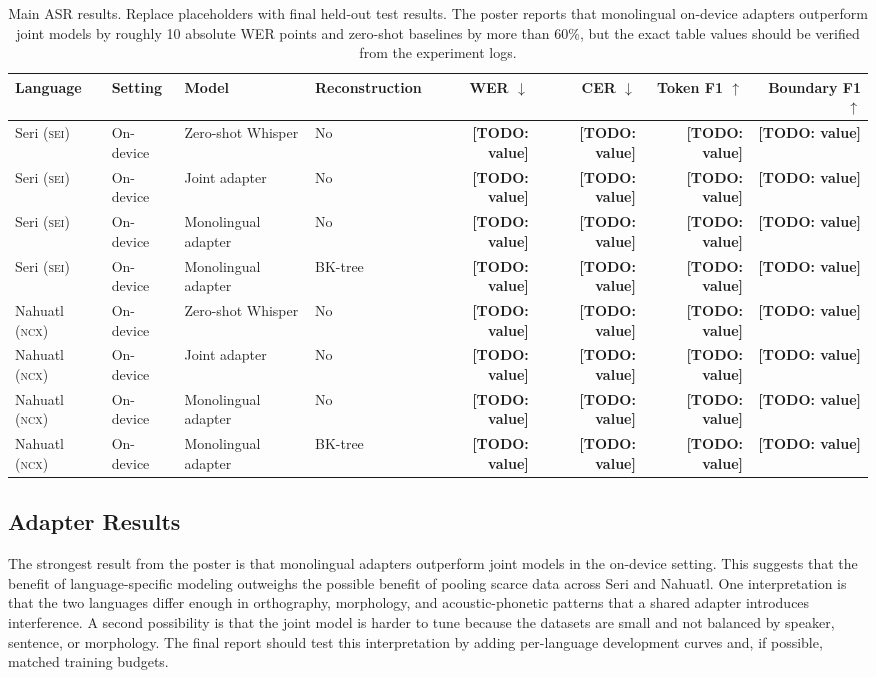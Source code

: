 \documentclass[11pt]{article}
\newcommand{\sei}{\textsc{sei}}
\newcommand{\ncx}{\textsc{ncx}}
\newcommand{\todo}[1]{\textbf{[TODO: #1]}}
\begin{document}
\begin{table}[t]
\centering
\small
\begin{tabular}{@{}llllrrrr@{}}
\toprule
Language & Setting & Model & Reconstruction & WER $\downarrow$ & CER $\downarrow$ & Token F1 $\uparrow$ & Boundary F1 $\uparrow$ \\
\midrule
Seri (\sei) & On-device & Zero-shot Whisper & No & \todo{value} & \todo{value} & \todo{value} & \todo{value} \\
Seri (\sei) & On-device & Joint adapter & No & \todo{value} & \todo{value} & \todo{value} & \todo{value} \\
Seri (\sei) & On-device & Monolingual adapter & No & \todo{value} & \todo{value} & \todo{value} & \todo{value} \\
Seri (\sei) & On-device & Monolingual adapter & BK-tree & \todo{value} & \todo{value} & \todo{value} & \todo{value} \\
\midrule
Nahuatl (\ncx) & On-device & Zero-shot Whisper & No & \todo{value} & \todo{value} & \todo{value} & \todo{value} \\
Nahuatl (\ncx) & On-device & Joint adapter & No & \todo{value} & \todo{value} & \todo{value} & \todo{value} \\
Nahuatl (\ncx) & On-device & Monolingual adapter & No & \todo{value} & \todo{value} & \todo{value} & \todo{value} \\
Nahuatl (\ncx) & On-device & Monolingual adapter & BK-tree & \todo{value} & \todo{value} & \todo{value} & \todo{value} \\
\bottomrule
\end{tabular}
\caption{Main ASR results. Replace placeholders with final held-out test results. The poster reports that monolingual on-device adapters outperform joint models by roughly 10 absolute WER points and zero-shot baselines by more than 60\%, but the exact table values should be verified from the experiment logs.}
\label{tab:main-results}
\end{table}

\subsection{Adapter Results}

The strongest result from the poster is that monolingual adapters outperform joint models in the on-device setting. This suggests that the benefit of language-specific modeling outweighs the possible benefit of pooling scarce data across Seri and Nahuatl. One interpretation is that the two languages differ enough in orthography, morphology, and acoustic-phonetic patterns that a shared adapter introduces interference. A second possibility is that the joint model is harder to tune because the datasets are small and not balanced by speaker, sentence, or morphology. The final report should test this interpretation by adding per-language development curves and, if possible, matched training budgets.
\end{document}
